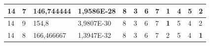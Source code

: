 \documentclass[conference]{IEEEtran}
\begin{document}
\begin{table}[]
\begin{tabular}{|llll|llllllll|}
\multicolumn{1}{|l|}{14}                                                    & \multicolumn{1}{l|}{7}                                                        & \multicolumn{1}{l|}{146,744444}                                                   & 1,9586E-28                     & \multicolumn{1}{l|}{8}                                                  & \multicolumn{1}{l|}{3}                                                  & \multicolumn{1}{l|}{6}                                                  & \multicolumn{1}{l|}{7}                                                  & \multicolumn{1}{l|}{\textbf{1}}                                         & \multicolumn{1}{l|}{4}                                                  & \multicolumn{1}{l|}{5}                                                  & 2                          \\ \hline
\multicolumn{1}{|l|}{14}                                                    & \multicolumn{1}{l|}{9}                                                        & \multicolumn{1}{l|}{154,8}                                                        & 3,9807E-30                     & \multicolumn{1}{l|}{8}                                                  & \multicolumn{1}{l|}{3}                                                  & \multicolumn{1}{l|}{6}                                                  & \multicolumn{1}{l|}{7}                                                  & \multicolumn{1}{l|}{\textbf{1}}                                         & \multicolumn{1}{l|}{5}                                                  & \multicolumn{1}{l|}{4}                                                  & 2                          \\ \hline
\multicolumn{1}{|l|}{14}                                                    & \multicolumn{1}{l|}{8}                                                        & \multicolumn{1}{l|}{166,466667}                                                   & 1,3947E-32                     & \multicolumn{1}{l|}{8}                                                  & \multicolumn{1}{l|}{3}                                                  & \multicolumn{1}{l|}{6}                                                  & \multicolumn{1}{l|}{7}                                                  & \multicolumn{1}{l|}{2}                                                  & \multicolumn{1}{l|}{5}                                                  & \multicolumn{1}{l|}{4}                                                  & \textbf{1}                 \\ \hline

\end{tabular}
\end{table}
\end{document}
